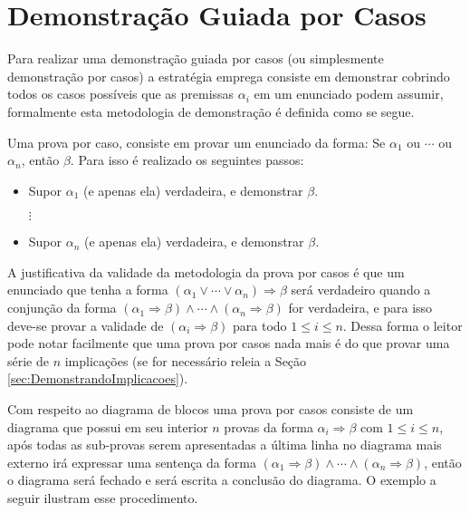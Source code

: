 \section{Demonstração Guiada por Casos}

Para realizar uma demonstração guiada por casos (ou simplesmente demonstração por casos) a estratégia emprega consiste em demonstrar cobrindo todos os casos possíveis que as premissas  $\alpha_i$ em um enunciado podem assumir, formalmente esta metodologia de demonstração é definida como se segue.

\begin{definicao}\label{metodo:PorCasos}
	Uma prova por caso, consiste em provar um enunciado da forma: Se $\alpha_1$ ou $\cdots$ ou $\alpha_n$, então $\beta$. Para isso é realizado os seguintes passos:
	\begin{itemize}
		\item Supor $\alpha_1$ (e apenas ela) verdadeira, e demonstrar $\beta$.
		
		$\vdots$
		
		\item Supor $\alpha_n$ (e apenas ela) verdadeira, e demonstrar $\beta$.
	\end{itemize}
\end{definicao}

A justificativa da validade  da metodologia da prova por casos é que um enunciado que tenha a forma $(\alpha_1 \lor \cdots \lor \alpha_n) \Rightarrow \beta$ será verdadeiro quando a conjunção da forma $(\alpha_1 \Rightarrow \beta) \land \cdots \land (\alpha_n \Rightarrow \beta)$ for verdadeira,  e para isso deve-se provar a validade de $(\alpha_i \Rightarrow \beta)$ para todo $1 \leq i \leq n$. Dessa forma o leitor pode notar facilmente que uma prova por casos nada mais é do que provar uma série de $n$ implicações (se for necessário releia a Seção \ref{sec:DemonstrandoImplicacoes}).

Com respeito ao diagrama de blocos uma prova por casos consiste de um diagrama que possui em seu interior $n$ provas da forma $\alpha_i \Rightarrow \beta$ com $1 \leq i \leq n$, após todas as sub-provas serem apresentadas a última linha no diagrama mais externo irá expressar uma sentença da forma $(\alpha_1 \Rightarrow \beta) \land \cdots \land (\alpha_n \Rightarrow \beta)$, então o diagrama será fechado e será escrita a conclusão do diagrama. O exemplo a seguir ilustram esse procedimento.


